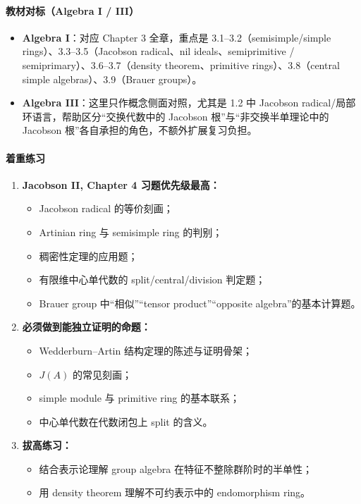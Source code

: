 \documentclass[12pt,a4paper]{ctexart}
\begin{document}
\paragraph{教材对标（Algebra I / III）}
\begin{itemize}
  \item \textbf{Algebra I}：对应 Chapter 3 全章，重点是 3.1--3.2（semisimple/simple rings）、3.3--3.5（Jacobson radical、nil ideals、semiprimitive / semiprimary）、3.6--3.7（density theorem、primitive rings）、3.8（central simple algebras）、3.9（Brauer groups）。
  \item \textbf{Algebra III}：这里只作概念侧面对照，尤其是 1.2 中 Jacobson radical/局部环语言，帮助区分“交换代数中的 Jacobson 根”与“非交换半单理论中的 Jacobson 根”各自承担的角色，不额外扩展复习负担。
\end{itemize}

\paragraph{着重练习}
\begin{enumerate}
  \item \textbf{Jacobson II, Chapter 4 习题优先级最高：}
  \begin{itemize}
    \item Jacobson radical 的等价刻画；
    \item Artinian ring 与 semisimple ring 的判别；
    \item 稠密性定理的应用题；
    \item 有限维中心单代数的 split/central/division 判定题；
    \item Brauer group 中“相似”“tensor product”“opposite algebra”的基本计算题。
  \end{itemize}
  \item \textbf{必须做到能独立证明的命题：}
  \begin{itemize}
    \item Wedderburn--Artin 结构定理的陈述与证明骨架；
    \item \(J(A)\) 的常见刻画；
    \item simple module 与 primitive ring 的基本联系；
    \item 中心单代数在代数闭包上 split 的含义。
  \end{itemize}
  \item \textbf{拔高练习：}
  \begin{itemize}
    \item 结合表示论理解 group algebra 在特征不整除群阶时的半单性；
    \item 用 density theorem 理解不可约表示中的 endomorphism ring。
  \end{itemize}
\end{enumerate}
\end{document}
